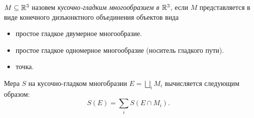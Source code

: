 \begin{definition}
    $M \subseteq \mathbb{R}^3$ назовем \textit{кусочно-гладким многообразием в $\mathbb{R}^3$},
    если $M$ представляется в виде конечного дизъюнктного объединения объектов вида
    \begin{itemize}
        \item простое гладкое двумерное многообразие.
        \item простое гладкое одномерное многообразие (носитель гладкого пути).
        \item точка.
    \end{itemize} 
\end{definition}

\begin{definition}
    Мера $S$ на кусочно-гладком многобразии $E = \bigsqcup_{i}{M_i}$ вычисляется следующим образом:
\[
    S(E) = \sum_{i}{S(E \cap M_i)}
.\] 
\end{definition}



